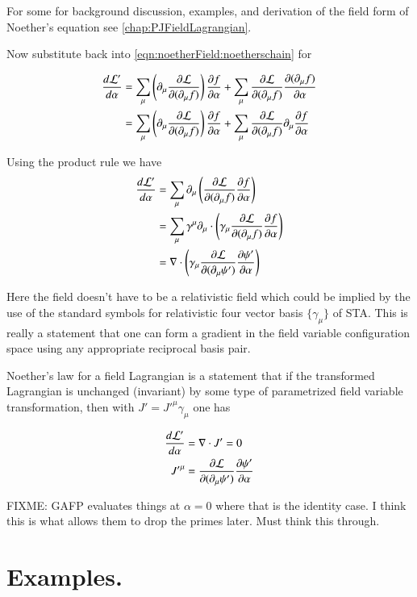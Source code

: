 For some 
for background discussion, examples, and derivation of the field form of Noether's equation see
\ref{chap:PJFieldLagrangian}.

Now substitute back into \ref{eqn:noetherField:noetherschain} for

\begin{align*}
\frac{d\mathcal{L}'}{d\alpha}
&= 
\sum_\mu \left( \partial_\mu \frac{\partial {\mathcal{L}}}{\partial {(\partial_\mu f)}}\right)
\frac{\partial {f}}{\partial {\alpha}} + \sum_\mu \frac{\partial {\mathcal{L}}}{\partial {(\partial_\mu f)}}\frac{\partial {(\partial_\mu f)}}{\partial {\alpha}} \\
&= 
\sum_\mu \left( \partial_\mu \frac{\partial {\mathcal{L}}}{\partial {(\partial_\mu f)}} \right)
\frac{\partial {f}}{\partial {\alpha}} + \sum_\mu \frac{\partial {\mathcal{L}}}{\partial {(\partial_\mu f)}} \partial_\mu \frac{\partial {f}}{\partial {\alpha}} \\
\end{align*}

Using the product rule we have
\begin{align*}
\frac{d\mathcal{L}'}{d\alpha}
&= \sum_\mu \partial_\mu \left( \frac{\partial {\mathcal{L}}}{\partial {(\partial_\mu f)}} \frac{\partial {f}}{\partial {\alpha}} \right) \\
&= \sum_\mu \gamma^\mu \partial_\mu \cdot \left( \gamma_\mu \frac{\partial {\mathcal{L}}}{\partial {(\partial_\mu f)}} \frac{\partial {f}}{\partial {\alpha}} \right) \\
&= \nabla \cdot \left( \gamma_\mu \frac{\partial {\mathcal{L}}}{\partial {(\partial_\mu \psi')}} \frac{\partial {\psi'}}{\partial {\alpha}} \right) \\
\end{align*}

Here the field doesn't have to be a relativistic field which could be implied by the use of the standard
symbols for relativistic four vector
basis $\{\gamma_\mu\}$ of STA.
This is really a statement that one can form a gradient in the field variable configuration space
using any appropriate reciprocal basis pair.

Noether's law for a field Lagrangian is a statement that if the transformed Lagrangian is unchanged (invariant) by
some type of parametrized field variable transformation, then with $J' = {J'}^\mu \gamma_\mu$ one has

\begin{align}
\frac{d\mathcal{L}'}{d\alpha} &= \nabla \cdot J' = 0 \\
{J'}^\mu &= \frac{\partial {\mathcal{L}}}{\partial {(\partial_\mu \psi')}} \frac{\partial {\psi'}}{\partial {\alpha}} 
\end{align}

FIXME: GAFP evaluates things at $\alpha = 0$ where that is the identity case.  I think this is what allows them to drop the primes later.  Must think
this through.

\section{Examples. }

